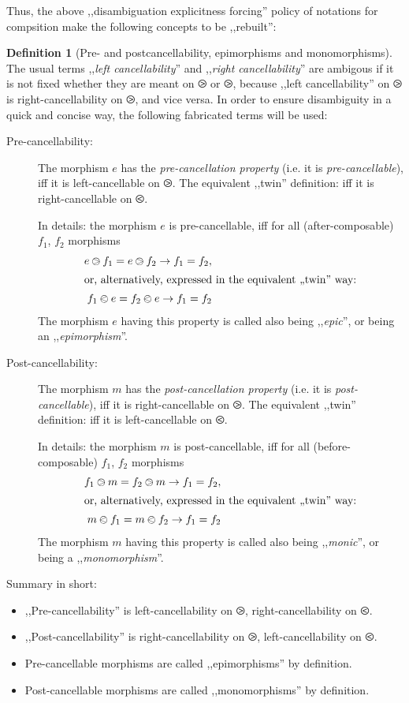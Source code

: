 \documentclass{article}
\theoremstyle{definition}
\newtheorem{dfn}{Definition}
\begin{document}
	Thus, the above ,,disambiguation explicitness forcing'' policy of notations for compsition make the following concepts to be ,,rebuilt'':

	\begin{dfn}[Pre- and postcancellability, epimorphisms and monomorphisms]
		The usual terms ,,\emph{left cancellability}'' and ,,\emph{right cancellability}'' are ambigous if it is not fixed whether they are meant on $\ogreaterthan$ or $\ogreaterthan$, because ,,left cancellability'' on $\ogreaterthan$ is right-cancellability on $\ogreaterthan$, and vice versa. In order to ensure disambiguity in a quick and concise way, the following fabricated terms will be used:
		\begin{description}
			\item[Pre-cancellability:] The morphism $e$ has the \emph{pre-cancellation property} (i.e. it is \emph{pre-cancellable}), iff it is left-cancellable on $\ogreaterthan$. The equivalent ,,twin'' definition: iff it is right-cancellable on $\olessthan$.

			In details: the morphism $e$ is pre-cancellable, iff for all (after-composable) $f_1$, $f_2$ morphisms
			\begin{align}
				e \ogreaterthan f_1 = e \ogreaterthan f_2 \to f_1 = f_2,\\\intertext{or, alternatively, expressed in the equivalent ,,twin'' way:}
				f_1 \olessthan e = f_2 \olessthan e \to f_1 = f_2
			\end{align}
			The morphism $e$ having this property is called also being ,,\emph{epic}'', or being an ,,\emph{epimorphism}''.
			\item[Post-cancellability:]  The morphism $m$ has the \emph{post-cancellation property} (i.e. it is \emph{post-cancellable}), iff it is right-cancellable on $\ogreaterthan$. The equivalent ,,twin'' definition: iff it is left-cancellable on $\olessthan$.

			In details:  the morphism $m$ is post-cancellable, iff for all (before-composable) $f_1$, $f_2$ morphisms
			\begin{align}
				f_1 \ogreaterthan m = f_2 \ogreaterthan m \to f_1 = f_2,\\\intertext{or, alternatively, expressed in the equivalent ,,twin'' way:}
				m \olessthan f_1 = m \olessthan f_2 \to f_1 = f_2
			\end{align}
			The morphism $m$ having this property is called also being ,,\emph{monic}'', or being a ,,\emph{monomorphism}''.
		\end{description}
		Summary in short:
		\begin{itemize}
			\item ,,Pre-cancellability'' is left-cancellability on $\ogreaterthan$, right-cancellability on $\olessthan$.
			\item ,,Post-cancellability'' is right-cancellability on $\ogreaterthan$, left-cancellability on $\olessthan$.
			\item Pre-cancellable morphisms are called ,,epimorphisms'' by definition.
			\item Post-cancellable morphisms are called ,,monomorphisms'' by definition.
		\end{itemize}
	\end{dfn}
\end{document}

